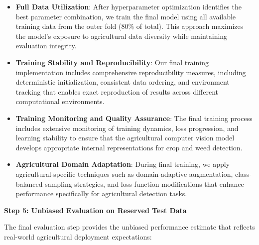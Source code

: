 \begin{itemize}
    \item \textbf{Full Data Utilization}: After hyperparameter optimization identifies the best parameter combination, we train the final model using all available training data from the outer fold (80\% of total). This approach maximizes the model's exposure to agricultural data diversity while maintaining evaluation integrity.
    
    \item \textbf{Training Stability and Reproducibility}: Our final training implementation includes comprehensive reproducibility measures, including deterministic initialization, consistent data ordering, and environment tracking that enables exact reproduction of results across different computational environments.
    
    \item \textbf{Training Monitoring and Quality Assurance}: The final training process includes extensive monitoring of training dynamics, loss progression, and learning stability to ensure that the agricultural computer vision model develops appropriate internal representations for crop and weed detection.
    
    \item \textbf{Agricultural Domain Adaptation}: During final training, we apply agricultural-specific techniques such as domain-adaptive augmentation, class-balanced sampling strategies, and loss function modifications that enhance performance specifically for agricultural detection tasks.
\end{itemize}

\textbf{Step 5: Unbiased Evaluation on Reserved Test Data}

The final evaluation step provides the unbiased performance estimate that reflects real-world agricultural deployment expectations:

